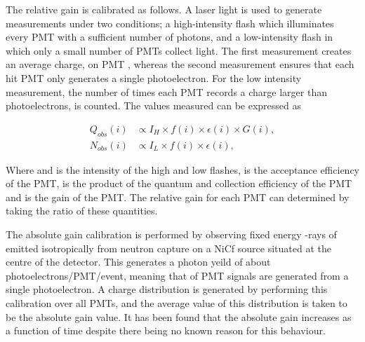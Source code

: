 The relative gain is calibrated as follows. A laser light is used to generate measurements under two conditions; a high-intensity flash which illuminates every PMT with a sufficient number of photons, and a low-intensity flash in which only a small number of PMTs collect light. The first measurement creates an average charge,  on PMT , whereas the second measurement ensures that each hit PMT only generates a single photoelectron. For the low intensity measurement, the number of times each PMT records a charge larger than  photoelectrons,  is counted. The values measured can be expressed as

\begin{equation}
  \label{eq:T2KSKExp_RelativeGainCalib}
  \begin{split}
    Q_{obs}(i) &\propto I_{H} \times f(i) \times \epsilon(i) \times G(i), \\
    N_{obs}(i) &\propto I_{L} \times f(i) \times \epsilon(i),
  \end{split}
\end{equation}

Where  and  is the intensity of the high and low flashes,  is the acceptance efficiency of the  PMT,  is the product of the quantum and collection efficiency of the  PMT and  is the gain of the 	PMT. The relative gain for each PMT can determined by taking the ratio of these quantities.

The absolute gain calibration is performed by observing fixed energy \quickmath{\gamma}-rays of  emitted isotropically from neutron capture on a NiCf source situated at the centre of the detector. This generates a photon yeild of about  photoelectrons/PMT/event, meaning that  of PMT signals are generated from a single photoelectron. A charge distribution is generated by performing this calibration over all PMTs, and the average value of this distribution is taken to be the absolute gain value. It has been found that the absolute gain increases as a function of time despite there being no known reason for this behaviour.

